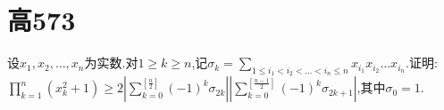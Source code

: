 \documentclass[]{article}
\title{}
\author{}
\date{}
\begin{document}
\maketitle
\section{高573}{
设$x_1,x_2,…,x_n$为实数.对$\displaystyle 1\geq k\geq n$,记$\sigma_k=\sum\limits_{1\leq i_1<i_2<…<i_n\leq n}{x_i_1 x_i_2 …x_i_n}$.证明:$\displaystyle \prod\limits_{k=1}^n(x_k^2+1)\geq 2\left| \sum\limits_{k=0}^{\left[ \frac{n}{2}\right]}(-1)^k\sigma_{2k} \right|\left| \sum\limits_{k=0}^{\left[ \frac{n-1}{2}\right]}(-1)^k\sigma_{2k+1} \right|$,其中$\sigma_0=1$.
}
\end{document}
